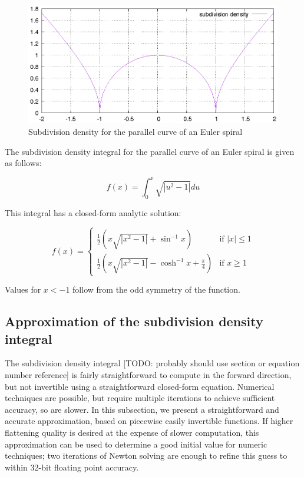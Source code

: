 \documentclass[format=acmsmall]{acmart}
\begin{document}
\begin{figure}
    \includegraphics[scale=0.6]{subdiv_density}
    \caption{Subdivision density for the parallel curve of an Euler spiral}
    \label{fig:subdiv_density}
\end{figure}

The subdivision density integral for the parallel curve of an Euler spiral is given as follows:

\[
    f(x) = \int_0^x\sqrt{|u^2 - 1|} du
\]

This integral has a closed-form analytic solution:

\[
    f(x) = \left\{
        \begin{array}{rl}
            \frac{1}{2}(x\sqrt{|x^2-1|} + \sin^{-1}x) & \text{if } |x| \leq 1 \\
            \frac{1}{2}(x\sqrt{|x^2-1|} - \cosh^{-1}x + \frac{\pi}{4}) & \text{if } x \geq 1
        \end{array}
    \right.
\]

Values for $x<-1$ follow from the odd symmetry of the function. 


\subsection{Approximation of the subdivision density integral}

The subdivision density integral [TODO: probably should use section or equation number reference] is fairly straightforward to compute in the forward direction, but not invertible using a straightforward closed-form equation. Numerical techniques are possible, but require multiple iterations to achieve sufficient accuracy, so are slower. In this subsection, we present a straightforward and accurate approximation, based on piecewise easily invertible functions. If higher flattening quality is desired at the expense of slower computation, this approximation can be used to determine a good initial value for numeric techniques; two iterations of Newton solving are enough to refine this guess to within 32-bit floating point accuracy.
\end{document}
